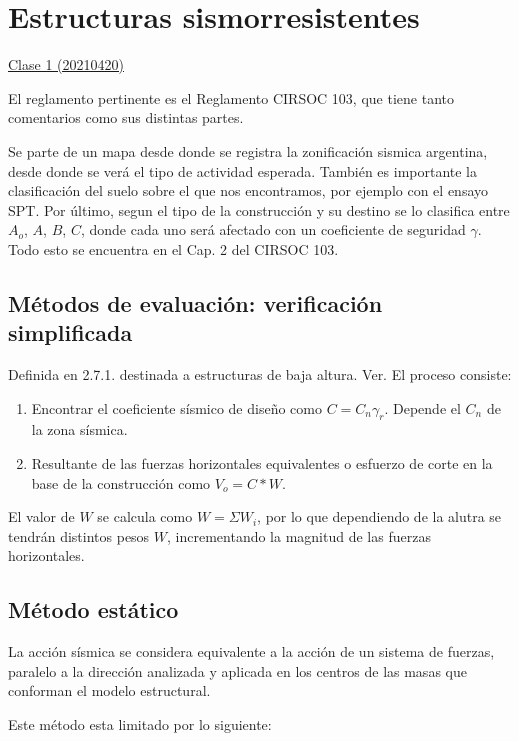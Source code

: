 \documentclass[../main.tex]{subfiles}
\begin{document}
\section{Estructuras sismorresistentes}

\href{https://youtu.be/6VVqDEFBOIk}{Clase 1 (20210420)}

El reglamento pertinente es el Reglamento CIRSOC 103, que tiene tanto comentarios
como sus distintas partes.

Se parte de un mapa desde donde se registra la zonificación sismica argentina, 
desde donde se verá el tipo de actividad esperada. También es importante la
clasificación del suelo sobre el que nos encontramos, por ejemplo con el 
ensayo SPT. Por último, segun el tipo de la construcción y su destino se lo clasifica
entre $A_o$, $A$, $B$, $C$, donde cada uno será afectado con un coeficiente de
seguridad $\gamma$. Todo esto se encuentra en el Cap. 2 del CIRSOC 103.

\subsection{Métodos de evaluación: verificación simplificada}

Definida en 2.7.1. destinada a estructuras de baja altura. Ver. %
El proceso consiste:

\begin{enumerate}
  \item Encontrar el coeficiente sísmico de diseño como $C=C_n \gamma_r$. Depende
    el $C_n$ de la zona sísmica.
   \item Resultante de las fuerzas horizontales equivalentes o esfuerzo de corte
     en la base de la construcción como $V_o = C*W$.
\end{enumerate}

El valor de $W$ se calcula como  $W=\Sigma W_i$, por lo que dependiendo de la alutra
se tendrán distintos pesos $W$, incrementando la magnitud de las fuerzas 
horizontales.


\subsection{Método estático}

La acción sísmica se considera equivalente a la acción de un sistema de fuerzas,
paralelo a la dirección analizada y aplicada en los centros de las masas que 
conforman el modelo estructural.

Este método esta limitado por lo siguiente:
\end{document}
